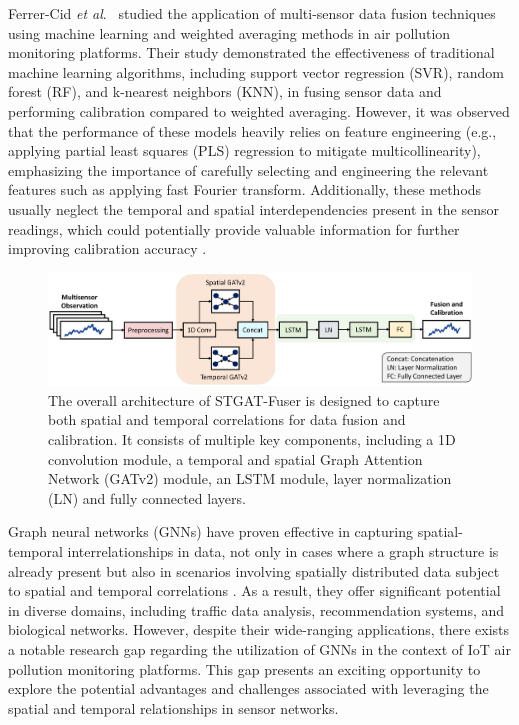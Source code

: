 \documentclass[conference,a4paper]{IEEEtran}
\begin{document}
Ferrer-Cid \emph{et al}.\ \cite{pau1} studied the application of multi-sensor data fusion techniques using machine learning and weighted averaging methods in air pollution monitoring platforms. Their study demonstrated the effectiveness of traditional machine learning algorithms, including support vector regression (SVR), random forest (RF), and k-nearest neighbors (KNN), in fusing sensor data and performing calibration compared to weighted averaging. However, it was observed that the performance of these models heavily relies on feature engineering (e.g., applying partial least squares (PLS) regression to mitigate multicollinearity), emphasizing the importance of carefully selecting and engineering the relevant features such as applying fast Fourier transform\cite{marathe2021currentsense}. Additionally, these methods usually neglect the temporal and spatial interdependencies present in the sensor readings, which could potentially provide valuable information for further improving calibration accuracy \cite{allka}.

\begin{figure}
  \centering
\includegraphics[width=0.95\linewidth]{Architecture.pdf}
  \caption{The overall architecture of STGAT-Fuser is designed to capture both spatial and temporal correlations for data fusion and calibration. It consists of multiple key components, including a 1D convolution module, a temporal and spatial Graph Attention Network (GATv2) module, an LSTM module, layer normalization (LN) and fully connected layers.}
  \label{fig:architecture}
\end{figure}


Graph neural networks (GNNs)  have proven effective in capturing spatial-temporal interrelationships in data, not only in cases where a graph structure is already present but also in scenarios involving spatially distributed data subject to spatial and temporal correlations \cite{Scarselli,Wu, zhou2020graph}.  As a result, they offer significant potential in diverse domains, including traffic data analysis\cite{Cui2020graph,jiang2022graph, bui2022spatial}, recommendation systems\cite{rec}, and biological networks\cite{biological}. However, despite their wide-ranging applications, there exists a notable research gap regarding  the utilization of GNNs in the context of IoT air pollution monitoring platforms. This gap presents an exciting opportunity to explore the potential advantages and challenges associated with leveraging the spatial and temporal relationships in sensor networks.
\end{document}
